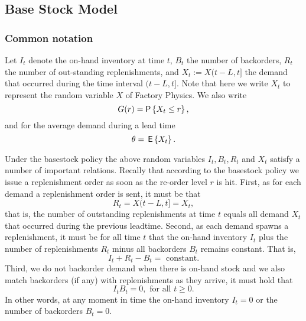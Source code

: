 

\subsection{Base Stock Model}


\subsubsection{Common notation}
\label{sec:common-notation}

Let $I_t$ denote the on-hand inventory at time $t$, $B_t$ the number
of backorders, $R_t$ the number of out-standing replenishments, and
$X_t := X(t-L,t]$ the demand that occurred during the time interval
$(t-L, t]$. Note that here we write $X_t$ to represent the
random variable $X$ of Factory Physics.
We also write
\begin{equation}
  \label{eq:16}
   G(r) = \P{X_t\leq r},
\end{equation}
and for the average demand during a lead time 
\begin{equation*}
\theta = \,\mathsf{E}\left\{X_t\right\}.
\end{equation*}

Under the basestock policy the above random variables $I_t, B_t, R_t$
and $X_t$ satisfy a number of important relations.  Recally that
according to the basestock policy we issue a replenishment order as
soon as the re-order level $r$ is hit. First, as for each demand a
replenishment order is sent, it must be that
\begin{equation}
  \label{eq:8}
   R_t = X(t-L, t] = X_t,
\end{equation}
that is, the number of outstanding replenishments at time $t$ equals
all demand $X_t$ that occurred during the previous leadtime.  
Second, as each demand spawns a replenishment, it must be for all time
$t$ that the on-hand inventory $I_t$ plus the number of
replenishments $R_t$ minus all backorders $B_t$ remains
constant. That is, 
\begin{equation*}
I_t + R_t - B_t = \text{ constant}.
\end{equation*}
Third, we do not backorder demand when there is on-hand stock and we
also match backorders (if any) with replenishments as they arrive, it
must hold that
\begin{equation}
  \label{eq:9}
   I_t B_t =0, \text{ for all }  t\geq 0.
\end{equation}
In other words, at any moment in time the on-hand inventory $I_t = 0$ or the
number of backorders $B_t=0$.

